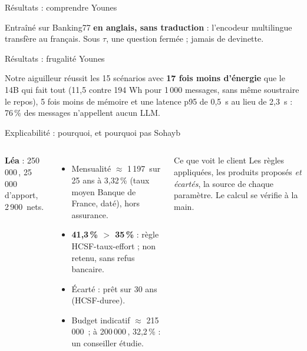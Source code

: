 \documentclass[aspectratio=169,11pt]{beamer}
\newcommand{\eur}{\,\texteuro}
\newcommand{\qui}[1]{\hfill{\scriptsize\color{darkgray}\mdseries #1}}
\newcommand{\f}[1]{{\ttfamily\small #1}}
\begin{document}
\begin{frame}{Résultats : comprendre \qui{Younes}}
  
  \medskip

  \small Entraîné sur Banking77 \textbf{en anglais, sans traduction} : l'encodeur multilingue
  transfère au français. Sous $\tau$, une question fermée ; jamais de devinette.
\end{frame}

\begin{frame}{Résultats : frugalité \qui{Younes}}
  
  \medskip

  \small Notre aiguilleur réussit les 15 scénarios avec \textbf{17 fois moins d'énergie} que le 14B qui fait
  tout (11,5 contre 194 Wh pour 1\,000 messages, sans même soustraire le repos), 5 fois moins de mémoire
  et une latence p95 de 0,5~s au lieu de 2,3~s : 76\,\% des messages n'appellent aucun LLM.
\end{frame}

\begin{frame}{Explicabilité : pourquoi, et pourquoi pas \qui{Sohayb}}
  \begin{columns}[T]
    \textbf{Léa} : 250\,000\eur{}, 25\,000\eur{} d'apport, 2\,900\eur{} nets.
    \begin{itemize}
      \item Mensualité $\approx$ 1\,197\eur{} sur 25 ans à 3,32\,\% (taux moyen Banque de France,
            daté), hors assurance.
      \item \textcolor{kored}{\textbf{41,3\,\% $>$ 35\,\%}} : règle \f{HCSF-taux-effort} ; non retenu,
            sans refus bancaire.
      \item Écarté : prêt sur 30 ans (\f{HCSF-duree}).
      \item Budget indicatif $\approx$ 215\,000\eur{} ; à 200\,000\eur{}, 32,2\,\% : un conseiller étudie.
    \end{itemize}
    \begin{block}{Ce que voit le client}
      Les règles appliquées, les produits proposés \emph{et écartés}, la source de chaque
      paramètre. Le calcul se vérifie à la main.
    \end{block}
  \end{columns}
\end{frame}
\end{document}
